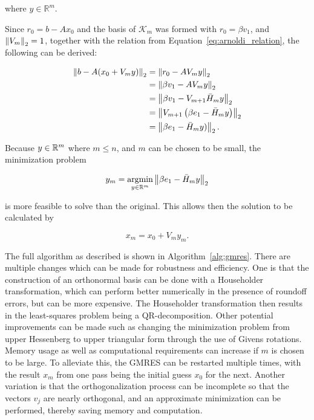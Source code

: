 where $y \in \mathbb{R}^m$.

Since $r_0 = b-A x_0$ and the basis of $\mathcal{K}_m$ was formed with $r_0 = \beta v_1$, and $\left\lVert V_m\right\rVert_2 = 1$, together with the relation from Equation~\ref{eq:arnoldi_relation}, the following can be derived:

\begin{equation}
    \begin{aligned}
        \left\lVert b - A(x_0 + V_m y)\right\rVert_2 & = \left\lVert r_0 - A V_m y\right\rVert_2 \\
                                 & = \left\lVert\beta v_1 - A V_m y\right\rVert_2 \\
                                 & = \left\lVert\beta v_1 - V_{m+1}\bar{H}_m y\right\rVert_2 \\
                                 & = \left\lVert V_{m+1}\left(\beta e_1 - \bar{H}_m y \right)\right\rVert_2 \\
                                 & = \left\lVert\beta e_1 - \bar{H}_m y )\right\rVert_2.
    \end{aligned}
\end{equation}

Because $y \in \mathbb{R}^m$ where $m \leq n$, and $m$ can be chosen to be small, the minimization problem 

\begin{equation}
    y_m  = \operatorname*{argmin}_{y \in \mathbb{R}^m} \left\lVert\beta e_1 - \bar{H}_m y\right\rVert_2
\end{equation}

is more feasible to solve than the original. This allows then the solution to be calculated by

\begin{equation}
    x_m = x_0 + V_m y_m.
\end{equation}

The full algorithm as described is shown in Algorithm~\ref{alg:gmres}. There are multiple changes which can be made for robustness and efficiency. One is that the construction of an orthonormal basis can be done with a Householder transformation, which can perform better numerically in the presence of roundoff errors, but can be more expensive. The Householder transformation then results in the least-squares problem being a QR-decomposition. Other potential improvements can be made such as changing the minimization problem from upper Hessenberg to upper triangular form through the use of Givens rotations. Memory usage as well as computational requirements can increase if $m$ is chosen to be large. To alleviate this, the GMRES can be restarted multiple times, with the result $x_m$ from one pass being the initial guess $x_0$ for the next. Another variation is that the orthogonalization process can be incomplete so that the vectors $v_j$ are nearly orthogonal, and an approximate minimization can be performed, thereby saving memory and computation.


